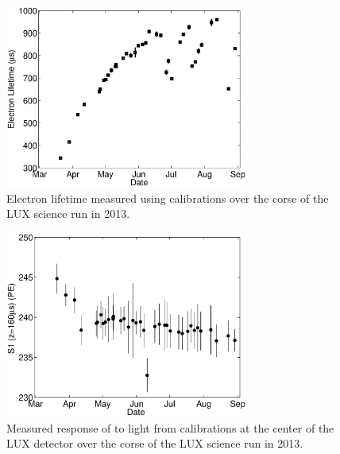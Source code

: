 \begin{figure}[h!]\centering
\includegraphics[width=80mm]{Chapter_XYZ_Corr/Thesis_Corr_Plots/lifetime_fig_2.eps}
\caption{Electron lifetime measured using \KrCal calibrations over the corse of the LUX science run in 2013.}
\label{fig:S2_EL_time}
\end{figure}

\begin{figure}[h!]\centering
\includegraphics[width=80mm]{Chapter_XYZ_Corr/Thesis_Corr_Plots/s1_center_fig_2.eps}
\caption{Measured response of to light from \KrCal calibrations at the center of the LUX detector over the corse of the LUX science run in 2013.}
\label{fig:S1_center_time}
\end{figure}





